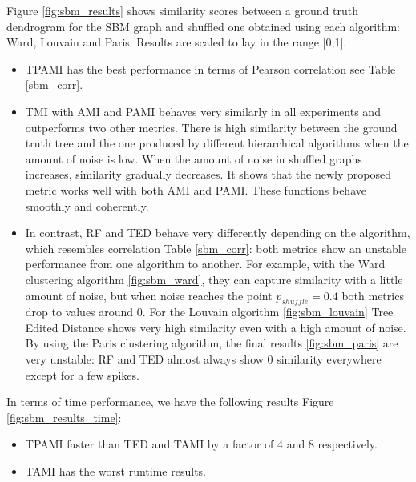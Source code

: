 Figure \ref{fig:sbm_results} shows similarity scores between a ground truth dendrogram for the SBM graph and shuffled one obtained using each algorithm: Ward, Louvain and Paris. Results are scaled to lay in the range [0,1].

\begin{itemize}
	\item TPAMI has the best performance in terms of Pearson correlation see Table \ref{sbm_corr}.
	\item TMI with AMI and PAMI behaves very similarly in all experiments and outperforms two other metrics. There is high similarity between the ground truth tree and the one produced by different hierarchical algorithms when the amount of noise is low. When the amount of noise in shuffled graphs increases, similarity gradually decreases. It shows that the newly proposed metric works well with both AMI and PAMI. These functions behave smoothly and coherently. 
	\item In contrast, RF and TED behave very differently depending on the algorithm, which resembles correlation Table \ref{sbm_corr}: both metrics show an unstable performance from one algorithm to another. For example, with the Ward clustering algorithm \ref{fig:sbm_ward}, they can capture similarity with a little amount of noise, but when noise reaches the point $p_{shuffle}=0.4$ both metrics drop to values around 0. For the Louvain algorithm \ref{fig:sbm_louvain} Tree Edited Distance shows very high similarity even with a high amount of noise. By using the Paris clustering algorithm, the final results \ref{fig:sbm_paris} are very unstable: RF and TED almost always show 0 similarity everywhere except for a few spikes.
\end{itemize}

In terms of time performance, we have the following results Figure \ref{fig:sbm_results_time}:

\begin{itemize}
	\item TPAMI faster than TED and TAMI by a factor of 4 and 8 respectively.
	\item TAMI has the worst runtime results. 
\end{itemize} 

